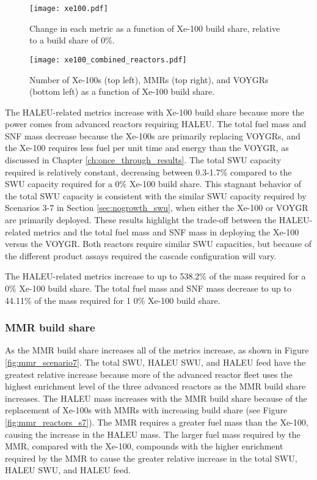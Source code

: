 \begin{figure}
    \centering
    \texttt{[image: xe100.pdf]}
    \caption{Change in each metric as a function of Xe-100 build share, 
    relative to a build share of 0\%.}
    \label{fig:xe100_scenario7}
\end{figure}

\begin{figure}
    \centering
    \texttt{[image: xe100\_combined\_reactors.pdf]}
    \caption{Number of Xe-100s (top left), MMRs (top right), and VOYGRs
    (bottom left) as a function of Xe-100 build share.}
    \label{fig:xe100_s7_combined_reactors}
\end{figure}

The \gls{HALEU}-related metrics increase with Xe-100 build share because more the 
power comes from advanced reactors requiring \gls{HALEU}. The total fuel mass and 
\gls{SNF} mass decrease because the Xe-100s are primarily replacing VOYGRs, and the 
Xe-100 requires less fuel per unit time and energy than the VOYGR, as discussed 
in Chapter \ref{ch:once_through_results}. The total \gls{SWU} capacity required 
is relatively constant, decreasing between 0.3-1.7\% compared to the \gls{SWU} capacity 
required for a 0\% Xe-100 build share. This stagnant behavior of the total 
\gls{SWU} capacity is consistent with the similar \gls{SWU} capacity required 
by Scenarios 3-7 in Section \ref{sec:nogrowth_swu}, when either the Xe-100 or 
VOYGR are primarily deployed. These results highlight the trade-off between the
\gls{HALEU}-related metrics and the total fuel mass and \gls{SNF} mass in deploying 
the Xe-100 versus the VOYGR. Both reactors require similar \gls{SWU} capacities, 
but because of the different product assays required the cascade configuration 
will vary. 

The \gls{HALEU}-related metrics increase to up to 538.2\% of the mass required 
for a 0\% Xe-100 build share. The total fuel mass and \gls{SNF} mass decrease 
to up to 44.11\% of the mass required for 1 0\% Xe-100 build share. 


\subsubsection{MMR build share}
As the \gls{MMR} build share increases all of the metrics increase, as shown 
in Figure \ref{fig:mmr_scenario7}. The total \gls{SWU}, \gls{HALEU} \gls{SWU}, 
and \gls{HALEU} feed have the greatest relative increase because more of the 
advanced reactor fleet uses the highest enrichment level of the three 
advanced reactors as the \gls{MMR} build share increases. The \gls{HALEU} mass 
increases with the \gls{MMR} build share because of the replacement of Xe-100s 
with \glspl{MMR} with increasing build share (see Figure \ref{fig:mmr_reactors_s7}).
The \gls{MMR} requires a greater fuel mass than the Xe-100, causing the increase 
in the \gls{HALEU} mass. The larger fuel mass required by the \gls{MMR}, compared 
with the Xe-100, compounds with the higher enrichment required by the \gls{MMR} 
to cause the greater relative increase in the total \gls{SWU}, \gls{HALEU} \gls{SWU}, 
and \gls{HALEU} feed. 

